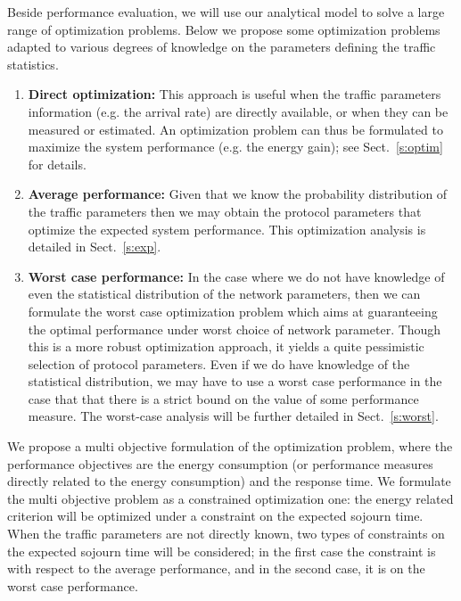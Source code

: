 \documentclass[journal]{IEEEtran}
\begin{document}
Beside performance evaluation, we will use our analytical model to solve a large range of optimization problems. Below we propose some optimization problems adapted to various degrees of knowledge on the parameters defining the traffic statistics. 
\begin{enumerate}
\item {\bf Direct optimization:}
This approach is useful when the traffic parameters information (e.g. the arrival rate) are directly available, or when they can be measured or estimated. An optimization problem can thus be formulated to maximize the system performance (e.g. the energy gain); see Sect.~\ref{s:optim} for details.
\item
{\bf Average performance:} Given that we know the probability distribution of the traffic parameters then we may obtain the protocol parameters that optimize the expected system performance. This optimization analysis is detailed in Sect.~\ref{s:exp}.
\item
{\bf Worst case performance:} In the case where we do not have knowledge of even the statistical distribution of the network parameters, then we can formulate the worst case optimization problem which aims at guaranteeing the optimal performance under worst choice of network parameter. Though this is a more robust optimization approach, it yields a quite pessimistic selection of protocol parameters. Even if we do have knowledge of the statistical distribution, we may have to use a worst case performance in the case that that there is a strict bound on the value of some performance measure. The worst-case analysis will be further detailed in Sect.~\ref{s:worst}.
\end{enumerate}
We propose a multi objective formulation of the optimization problem, where the performance objectives are the energy consumption (or performance measures directly related to the energy consumption) and the response time. We formulate the multi objective problem as a constrained optimization one: the energy related criterion will be optimized under a constraint on the expected sojourn time. When the traffic parameters are not directly known, two types of constraints on the expected sojourn time will be considered; in the first case the constraint is with respect to the average performance, and in the second case, it is on the worst case performance.
\end{document}
